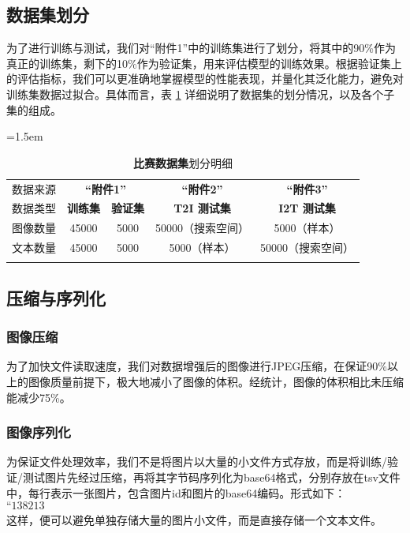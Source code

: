 \documentclass[a4paper]{zreport}
\begin{document}
\subsection{数据集划分}

为了进行训练与测试，我们对“附件1”中的训练集进行了划分，将其中的90\%作为真正的训练集，剩下的10\%作为验证集，用来评估模型的训练效果。根据验证集上的评估指标，我们可以更准确地掌握模型的性能表现，并量化其泛化能力，避免对训练集数据过拟合。具体而言，表 \ref{tbl:DataSplit} 详细说明了数据集的划分情况，以及各个子集的组成。

\begin{table}[h]
\centering
\tabcolsep=1.5em
\renewcommand\arraystretch{1.5}
\caption{\textbf{比赛数据集}划分明细}
\vspace{1em}
\begin{tabular}{c|c|c|c|c}
    \Xhline{2pt}
    数据来源 & \multicolumn{2}{c|}{\textbf{“附件1”}} & \multicolumn{1}{c|}{\textbf{“附件2”}} & 
    \multicolumn{1}{c}{\textbf{“附件3”}}\\
    
    \Xhline{1.5pt}

    数据类型 & \textbf{训练集} & \textbf{验证集} & \textbf{T2I 测试集} & \textbf{I2T 测试集} \\
    \Xhline{0.4pt}
    图像数量 & {45000} & {5000} & {50000（搜索空间）} & {5000（样本）} \\
    \Xhline{0.4pt}
    文本数量 & {45000} & {5000} & {5000（样本）} & {50000（搜索空间）} \\

    \Xhline{2pt}
\end{tabular} \label{tbl:DataSplit}
\end{table}

\subsection{压缩与序列化}

\subsubsection{图像压缩}
为了加快文件读取速度，我们对数据增强后的图像进行JPEG压缩，在保证90\%以上的图像质量前提下，极大地减小了图像的体积。经统计，图像的体积相比未压缩能减少75\%。

\subsubsection{图像序列化}
为保证文件处理效率，我们不是将图片以大量的小文件方式存放，而是将训练/验证/测试图片先经过压缩，再将其字节码序列化为base64格式，分别存放在tsv文件中，每行表示一张图片，包含图片id和图片的base64编码。形式如下：$$\text{“138213	/9j/4AAQSkZJRgABAQAAAQABAAD/2wBDAAgGBgcGBQgHBwcJCQgKDBQ”}$$
这样，便可以避免单独存储大量的图片小文件，而是直接存储一个文本文件。
\end{document}
